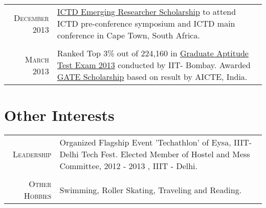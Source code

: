 \documentclass[a4paper,10pt]{article} %
\begin{document}
\begin{tabular}{rp{13cm}}

\textsc{December} 2013 & \href{http://ictd.cs.uct.ac.za/attending-scholarships.html#preconference}{ICTD Emerging Researcher Scholarship} to attend ICTD  pre-conference symposium and ICTD main conference in Cape Town, South Africa. \normalsize\\ \\

\textsc{March} 2013 & Ranked Top 3\% out of 224,160 in \href{http://www.gate.iitb.ac.in/gate2013/}{Graduate Aptitude Test Exam 2013} conducted by IIT- Bombay. Awarded \href{http://www.aicte-india.org/generalInstructions.php}{GATE Scholarship} based on result by AICTE, India.\normalsize\\


\end{tabular}


\section{\color{red} Other Interests}

\begin{tabular}{rp{13cm}}

\textsc{Leadership} & Organized Flagship Event 'Techathlon' of Eysa, IIIT-Delhi Tech Fest.\newline
			  Elected Member of Hostel and Mess Committee, 2012 - 2013 , IIIT - Delhi. \\ \\
\textsc{Other Hobbies} & Swimming, Roller Skating, Traveling and Reading.\\


\end{tabular}
\end{document}

